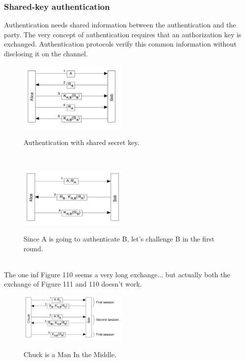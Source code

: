 \documentclass[10pt,a4paper]{article}
\begin{document}
\subsubsection{Shared-key authentication}
Authentication needs shared information between the authentication and the party. The very concept of authentication requires that an authorization key is exchanged. Authentication protocols verify this common information without disclosing it on the channel. 
\begin{figure}[h!]\hfill \includegraphics[width=150pt]{images/shared-key.png}\hspace*{\fill}
  \label{fig:shared-key}
  \caption{Authentication with shared secret key.}
\end{figure} \\
\begin{figure}[h!]\hfill \includegraphics[width=150pt]{images/shared-key2.png}\hspace*{\fill}
  \label{fig:shared-key2}
  \caption{Since A is going to authenticate B, let's challenge B in the first round.}
\end{figure} \\
The one inf Figure 110 seems a very long exchange... but actually both the exchange of Figure 111 and 110 doesn't work.
\begin{figure}[h!]\hfill \includegraphics[width=150pt]{images/shared-key3.png}\hspace*{\fill}
  \label{fig:shared-key3}
  \caption{Chuck is a Man In the Middle.}
\end{figure} \\
\end{document}
